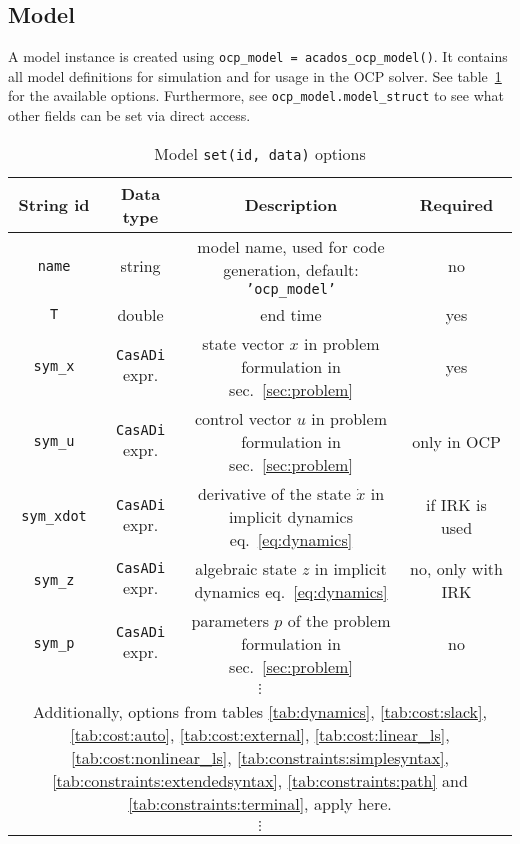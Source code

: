 \documentclass[
a4paper, %
10pt, %
notitlepage,
english]{CSUniSchoolLabReport}
\newcommand{\code}[1]{\texttt{#1}}
\newcommand{\str}[1]{\texttt{'#1'}}
\newcommand{\casadi}{\texttt{CasADi}}
\newcommand{\mandatory}{yes}
\newcommand{\optional}{no}
\begin{document}
\begin{appendices}
\section{Model}\label{sec:model}
%
A model instance is created using \code{ocp\_model = acados\_ocp\_model()}. It contains all model definitions for simulation and for usage in the OCP solver.
See table~\ref{tab:model:options} for the available options.
Furthermore, see \code{ocp\_model.model\_struct} to see what other fields can be set via direct access.
%
\begin{table}
	\centering
	\caption{Model \code{set(id, data)} options}
	\label{tab:model:options}
	\begin{tabular}{cccc}
		\toprule
		String id & Data type & Description & Required\\
		\midrule
		\code{name} & string & model name, used for code generation, default: \str{ocp\_model} & \optional \\
		\code{T} & double & end time & \mandatory \\
		\code{sym\_x} & \casadi{} expr. & state vector $x$ in problem formulation in sec.~\ref{sec:problem} & \mandatory \\
		\code{sym\_u} & \casadi{} expr. & control vector $u$ in problem formulation in sec.~\ref{sec:problem} & only in OCP \\
		\code{sym\_xdot} & \casadi{} expr. & derivative of the state $\dot{x}$ in implicit dynamics eq.~\eqref{eq:dynamics} & if IRK is used \\
		\code{sym\_z} & \casadi{} expr. & algebraic state $z$ in implicit dynamics eq.~\eqref{eq:dynamics} & \optional, only with IRK \\
		\code{sym\_p} & \casadi{} expr. & parameters $p$ of the problem formulation in sec.~\ref{sec:problem} & \optional \\
		\multicolumn{4}{c}{$\vdots$}\\
		\multicolumn{4}{c}{Additionally, options from tables \ref{tab:dynamics}, \ref{tab:cost:slack}, \ref{tab:cost:auto}, \ref{tab:cost:external}, \ref{tab:cost:linear_ls}, \ref{tab:cost:nonlinear_ls}, %
			\ref{tab:constraints:simplesyntax}, \ref{tab:constraints:extendedsyntax}, \ref{tab:constraints:path} and \ref{tab:constraints:terminal}, apply here.}\\
		\multicolumn{4}{c}{$\vdots$}\\
		\bottomrule
	\end{tabular}%
\end{table}%
%

\end{appendices}
\end{document}
